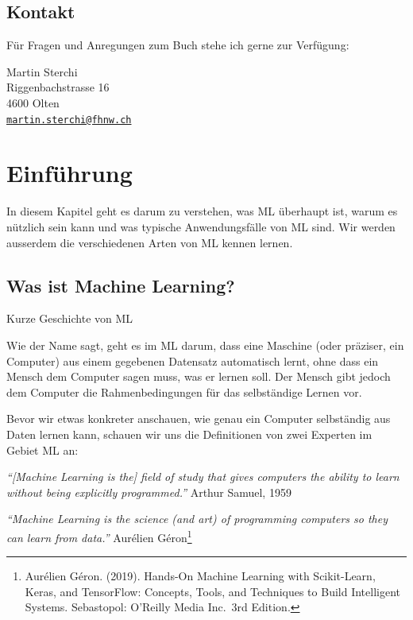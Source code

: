 \documentclass[
]{book}
\begin{document}
\hypertarget{kontakt}{%
\section*{Kontakt}\label{kontakt}}

Für Fragen und Anregungen zum Buch stehe ich gerne zur Verfügung:

Martin Sterchi\\
Riggenbachstrasse 16\\
4600 Olten\\
\href{mailto:martin.sterchi@fhnw.ch}{\nolinkurl{martin.sterchi@fhnw.ch}}

\hypertarget{intro}{%
\chapter{Einführung}\label{intro}}

In diesem Kapitel geht es darum zu verstehen, was ML überhaupt ist, warum es nützlich sein kann und was typische Anwendungsfälle von ML sind. Wir werden ausserdem die verschiedenen Arten von ML kennen lernen.

\hypertarget{was-ist-machine-learning}{%
\section{Was ist Machine Learning?}\label{was-ist-machine-learning}}

Kurze Geschichte von ML

Wie der Name sagt, geht es im ML darum, dass eine Maschine (oder präziser, ein Computer) aus einem gegebenen Datensatz automatisch lernt, ohne dass ein Mensch dem Computer sagen muss, was er lernen soll. Der Mensch gibt jedoch dem Computer die Rahmenbedingungen für das selbständige Lernen vor.

Bevor wir etwas konkreter anschauen, wie genau ein Computer selbständig aus Daten lernen kann, schauen wir uns die Definitionen von zwei Experten im Gebiet ML an:

\emph{``{[}Machine Learning is the{]} field of study that gives computers the ability to learn without being explicitly programmed.''} Arthur Samuel, 1959

\emph{``Machine Learning is the science (and art) of programming computers so they can learn from data.''} Aurélien Géron\footnote{Aurélien Géron. (2019). Hands-On Machine Learning with Scikit-Learn, Keras, and TensorFlow: Concepts, Tools, and Techniques to Build Intelligent Systems. Sebastopol: O'Reilly Media Inc.~3rd Edition.}
\end{document}
